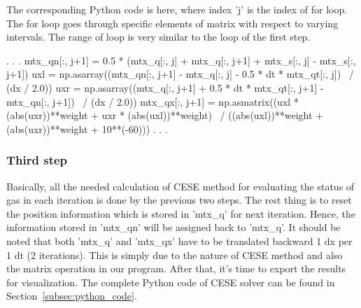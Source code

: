 \documentclass[a4paper,12pt]{article}
\begin{document}
The corresponding Python code is here, where index 'j' is the index of for loop. 
The for loop goes through specific elements of matrix with respect to varying 
intervals. The range of loop is very similar to the loop of the first step.
\begin{pythonNoIndex}
                            .
                            .
                            .
        mtx_qn[:, j+1] = 0.5 * (mtx_q[:, j] + mtx_q[:, j+1] + mtx_s[:, j] - mtx_s[:, j+1]) 
        uxl = np.asarray((mtx_qn[:, j+1] - mtx_q[:, j] - 0.5 * dt * mtx_qt[:, j]) \
                                                                    / (dx / 2.0))
        uxr = np.asarray((mtx_q[:, j+1] + 0.5 * dt * mtx_qt[:, j+1] - mtx_qn[:, j+1]) \
                                                                        / (dx / 2.0))
        mtx_qx[:, j+1] = np.asmatrix((uxl * (abs(uxr))**weight + uxr * (abs(uxl))**weight) \
                                      / ((abs(uxl))**weight + (abs(uxr))**weight + 10**(-60)))
                            .
                            .
                            .
\end{pythonNoIndex}

\subsubsection{Third step}
 \label{subsubsec:third_step}
Basically, all the needed calculation of CESE method for evaluating the status 
of gas in each iteration is done by the previous two steps. The rest thing is to 
reset the position information which is stored in 'mtx\_q' for next iteration. 
Hence, the information stored in 'mtx\_qn' will be assigned back to 'mtx\_q'. 
It should be noted that both 'mtx\_q' and 'mtx\_qx' have to be translated backward 
1 dx per 1 dt (2 iterations). This is simply due to the nature of CESE method 
and also the matrix operation in our program. After that, it's time to export 
the results for visualization. 
The complete Python code of CESE solver can be found 
in Section~\ref{subsec:python_code}.
\end{document}
